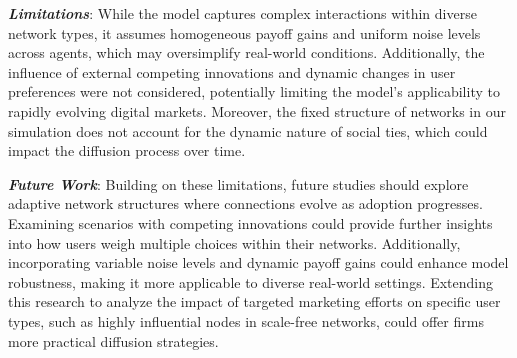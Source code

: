 \documentclass{article} %
\begin{document}
\textit{\textbf{Limitations}}: While the model captures complex interactions within diverse network types, it assumes homogeneous payoff gains and uniform noise levels across agents, which may oversimplify real-world conditions. Additionally, the influence of external competing innovations and dynamic changes in user preferences were not considered, potentially limiting the model’s applicability to rapidly evolving digital markets. Moreover, the fixed structure of networks in our simulation does not account for the dynamic nature of social ties, which could impact the diffusion process over time.

\textit{\textbf{Future Work}}: Building on these limitations, future studies should explore adaptive network structures where connections evolve as adoption progresses. Examining scenarios with competing innovations could provide further insights into how users weigh multiple choices within their networks. Additionally, incorporating variable noise levels and dynamic payoff gains could enhance model robustness, making it more applicable to diverse real-world settings. Extending this research to analyze the impact of targeted marketing efforts on specific user types, such as highly influential nodes in scale-free networks, could offer firms more practical diffusion strategies.
\end{document}
